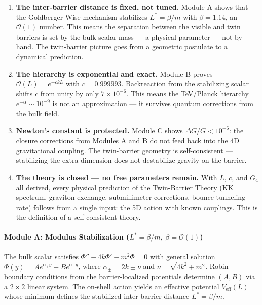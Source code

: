 \documentclass[
  11pt,
]{article}
\begin{document}
\begin{enumerate}
\def\labelenumi{\arabic{enumi}.}
\item
  \textbf{The inter-barrier distance is fixed, not tuned.} Module A
  shows that the Goldberger-Wise mechanism stabilizes \(L^* = \beta/m\)
  with \(\beta = 1.14\), an \(\mathcal{O}(1)\) number. This means the
  separation between the visible and twin barriers is set by the bulk
  scalar mass --- a physical parameter --- not by hand. The twin-barrier
  picture goes from a geometric postulate to a dynamical prediction.
\item
  \textbf{The hierarchy is exponential and exact.} Module B proves
  \(\mathcal{O}(L) = e^{-ckL}\) with \(c = 0.999993\). Backreaction from
  the stabilizing scalar shifts \(c\) from unity by only
  \(7 \times 10^{-6}\). This means the TeV/Planck hierarchy
  \(e^{-\alpha} \sim 10^{-9}\) is not an approximation --- it survives
  quantum corrections from the bulk field.
\item
  \textbf{Newton's constant is protected.} Module C shows
  \(\Delta G/G < 10^{-6}\): the closure corrections from Modules A and B
  do not feed back into the 4D gravitational coupling. The twin-barrier
  geometry is self-consistent --- stabilizing the extra dimension does
  not destabilize gravity on the barrier.
\item
  \textbf{The theory is closed --- no free parameters remain.} With
  \(L\), \(c\), and \(G_4\) all derived, every physical prediction of
  the Twin-Barrier Theory (KK spectrum, graviton exchange, submillimeter
  corrections, bounce tunneling rate) follows from a single input: the
  5D action with known couplings. This is the definition of a
  self-consistent theory.
\end{enumerate}

\bigskip

\hypertarget{module-a-modulus-stabilization-l-betam-beta-mathcalo1}{%
\paragraph{\texorpdfstring{Module A: Modulus Stabilization
(\(L^* = \beta/m\),
\(\beta = \mathcal{O}(1)\))}{Module A: Modulus Stabilization (L\^{}* = \textbackslash beta/m, \textbackslash beta = \textbackslash mathcal\{O\}(1))}}\label{module-a-modulus-stabilization-l-betam-beta-mathcalo1}}

The bulk scalar satisfies \(\Phi'' - 4k\Phi' - m^2\Phi = 0\) with
general solution \(\Phi(y) = Ae^{\alpha_+ y} + Be^{\alpha_- y}\), where
\(\alpha_\pm = 2k \pm \nu\) and \(\nu = \sqrt{4k^2 + m^2}\). Robin
boundary conditions from the barrier-localized potentials determine
\((A,B)\) via a \(2\times 2\) linear system. The on-shell action yields
an effective potential \(V_\text{eff}(L)\) whose minimum defines the
stabilized inter-barrier distance \(L^* = \beta/m\).
\end{document}
